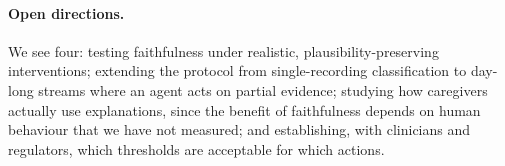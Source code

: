\documentclass[11pt,a4paper]{article}
\begin{document}
\paragraph{Open directions.} We see four: testing faithfulness under realistic, plausibility-preserving interventions; extending the protocol from single-recording classification to day-long streams where an agent acts on partial evidence; studying how caregivers actually use explanations, since the benefit of faithfulness depends on human behaviour that we have not measured; and establishing, with clinicians and regulators, which thresholds are acceptable for which actions.



\end{document}
